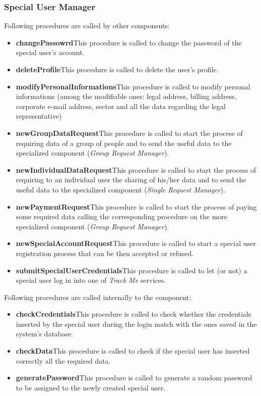 \subsubsection{Special User Manager}
Following procedures are called by other components:
\begin{itemize}
  \item \textbf{changePassowrd}\quad This procedure is called to change the password of the special user's account.
  \item \textbf{deleteProfile}\quad This procedure is called to delete the user's profile.
  \item \textbf{modifyPersonalInformations}\quad This procedure is called to modify personal informations (among the modifiable ones:  legal address, billing address, corporate e-mail address, sector and all the data regarding the legal representative)
  \item \textbf{newGroupDataRequest}\quad This procedure is called to start the process of requiring data of a group of people and to send the useful data to the specialized component (\textit{Group Request Manager}).
  \item \textbf{newIndividualDataRequest}\quad This procedure is called to start the process of requiring to an individual user the sharing of his/her data and to send the useful data to the specialized component (\textit{Single Request Manager}).
  \item \textbf{newPaymentRequest}\quad This procedure is called to start the process of paying some required data calling the corresponding procedure on the more specialized component (\textit{Group Request Manager}).
  \item \textbf{newSpecialAccountRequest}\quad This procedure is called to start a special user registration process that can be then accepted or refused.
  \item \textbf{submitSpecialUserCredentials}\quad This procedure is called to let (or not) a special user log in into one of \textit{Track Me} services.
\end{itemize}

\myparagraph{}
Following procedures are called internally to the component:
\begin{itemize}
  \item \textbf{checkCredentials}\quad This procedure is called to check whether the credentials inserted by the special user during the login match with the ones saved in the system's database.
  \item \textbf{checkData}\quad This procedure is called to check if the special user has inserted correctly all the required data.
  \item \textbf{generatePassword}\quad This procedure is called to generate a random password to be assigned to the newly created special user.
\end{itemize}

